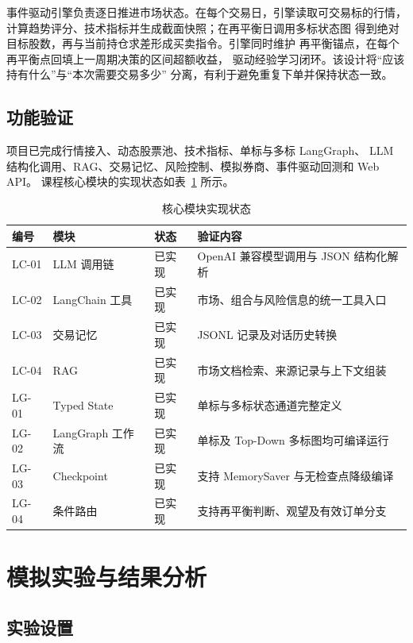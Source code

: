 \documentclass[a4paper,11pt]{article}
\begin{document}
事件驱动引擎负责逐日推进市场状态。在每个交易日，引擎读取可交易标的行情，
计算趋势评分、技术指标并生成截面快照；在再平衡日调用多标状态图
得到绝对目标股数，再与当前持仓求差形成买卖指令。引擎同时维护
再平衡锚点，在每个再平衡点回填上一周期决策的区间超额收益，
驱动经验学习闭环。该设计将``应该持有什么''与``本次需要交易多少''
分离，有利于避免重复下单并保持状态一致。

\subsection{功能验证}

项目已完成行情接入、动态股票池、技术指标、单标与多标 LangGraph、
LLM 结构化调用、RAG、交易记忆、风险控制、模拟券商、事件驱动回测和 Web API。
课程核心模块的实现状态如表~\ref{tab:status} 所示。

\begin{table}[H]
\centering
\caption{核心模块实现状态}
\begin{tabularx}{0.96\linewidth}{lllX}
\toprule
编号 & 模块 & 状态 & 验证内容 \\
\midrule
LC-01 & LLM 调用链 & 已实现 & OpenAI 兼容模型调用与 JSON 结构化解析 \\
LC-02 & LangChain 工具 & 已实现 & 市场、组合与风险信息的统一工具入口 \\
LC-03 & 交易记忆 & 已实现 & JSONL 记录及对话历史转换 \\
LC-04 & RAG & 已实现 & 市场文档检索、来源记录与上下文组装 \\
LG-01 & Typed State & 已实现 & 单标与多标状态通道完整定义 \\
LG-02 & LangGraph 工作流 & 已实现 & 单标及 Top-Down 多标图均可编译运行 \\
LG-03 & Checkpoint & 已实现 & 支持 MemorySaver 与无检查点降级编译 \\
LG-04 & 条件路由 & 已实现 & 支持再平衡判断、观望及有效订单分支 \\
\bottomrule
\end{tabularx}
\label{tab:status}
\end{table}

\section{模拟实验与结果分析}

\subsection{实验设置}
\end{document}
